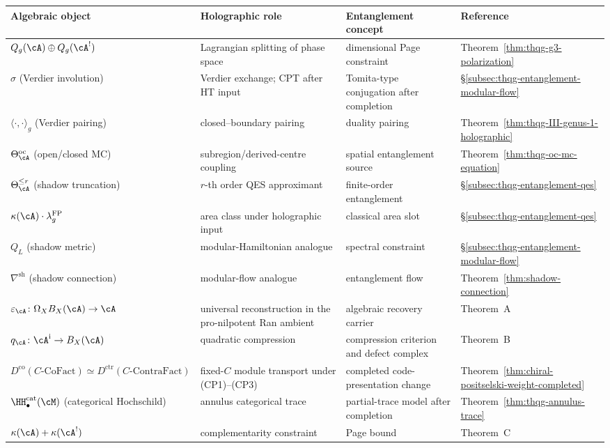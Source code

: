 \begin{center}
\renewcommand{\arraystretch}{1.4}
\small
\begin{tabular}{@{}p{}p{}
 p{}p{}@{}}
\textbf{Algebraic object} & \textbf{Holographic role}
 & \textbf{Entanglement concept} & \textbf{Reference} \\
\midrule
$Q_g(\cA) \oplus Q_g(\cA^!)$
 & Lagrangian splitting of phase space
 & dimensional Page constraint
 & Theorem~\ref{thm:thqg-g3-polarization} \\
$\sigma$ (Verdier involution)
 & Verdier exchange; CPT after HT input
 & Tomita-type conjugation after completion
 & \S\ref{subsec:thqg-entanglement-modular-flow} \\
$\langle \cdot, \cdot \rangle_g$ (Verdier pairing)
 & closed--boundary pairing
 & duality pairing
 & Theorem~\ref{thm:thqg-III-genus-1-holographic} \\
$\Theta^{\mathrm{oc}}_\cA$ (open/closed MC)
 & subregion/derived-centre coupling
 & spatial entanglement source
 & Theorem~\ref{thm:thqg-oc-mc-equation} \\
$\Theta_\cA^{\le r}$ (shadow truncation)
 & $r$-th order QES approximant
 & finite-order entanglement
 & \S\ref{subsec:thqg-entanglement-qes} \\
$\kappa(\cA) \cdot \lambda_g^{\mathrm{FP}}$
 & area class under holographic input
 & classical area slot
 & \S\ref{subsec:thqg-entanglement-qes} \\
$Q_L$ (shadow metric)
 & modular-Hamiltonian analogue
 & spectral constraint
 & \S\ref{subsec:thqg-entanglement-modular-flow} \\
$\nabla^{\mathrm{sh}}$ (shadow connection)
 & modular-flow analogue
 & entanglement flow
 & Theorem~\ref{thm:shadow-connection} \\
$\varepsilon_\cA\colon\Omega_XB_X(\cA)\to\cA$
 & universal reconstruction in the pro-nilpotent Ran ambient
 & algebraic recovery carrier
 & Theorem~A \\
$q_\cA\colon\cA^{\mathrm i}\to B_X(\cA)$
 & quadratic compression
 & compression criterion and defect complex
 & Theorem~B \\
$D^{\mathrm{co}}(C\text{-}\mathrm{CoFact})
 \simeq D^{\mathrm{ctr}}(C\text{-}\mathrm{ContraFact})$
 & fixed-$C$ module transport under \textup{(CP1)--(CP3)}
 & completed code-presentation change
 & Theorem~\ref{thm:chiral-positselski-weight-completed} \\
$\HH^{\mathrm{cat}}_\bullet(\cM)$ (categorical Hochschild)
 & annulus categorical trace
 & partial-trace model after completion
 & Theorem~\ref{thm:thqg-annulus-trace} \\
$\kappa(\cA)+\kappa(\cA^!)$
 & complementarity constraint
 & Page bound
 & Theorem~C
\end{tabular}
\end{center}

